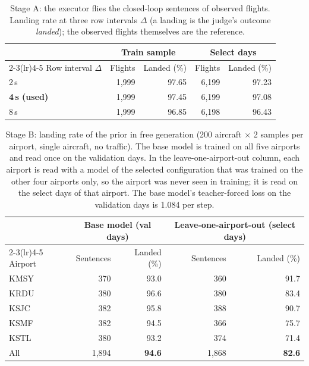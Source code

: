 
\begin{table}[t]
\centering
\caption{Stage A: the executor flies the closed-loop sentences of observed flights. Landing rate at three row intervals
$\Delta$ (a landing is the judge's outcome \emph{landed}); the observed flights themselves are the reference.}
\label{tab:result-stage-a}
\small
\renewcommand{\arraystretch}{1.2}
\begin{tabular}{@{}l rr rr@{}}
\toprule
 & \multicolumn{2}{c}{Train sample} & \multicolumn{2}{c}{Select days} \\
\cmidrule(lr){2-3}\cmidrule(lr){4-5}
Row interval $\Delta$ & Flights & Landed (\%) & Flights & Landed (\%) \\
\midrule
2\,s & 1{,}999 & 97.65 & 6{,}199 & 97.23 \\
\textbf{4\,s (used)} & 1{,}999 & 97.45 & 6{,}199 & 97.08 \\
8\,s & 1{,}999 & 96.85 & 6{,}198 & 96.43 \\
\bottomrule
\end{tabular}
\end{table}

\begin{table}[t]
\centering
\caption{Stage B: landing rate of the prior in free generation (200 aircraft $\times$ 2 samples per airport,
single aircraft, no traffic). The base model is trained on all five airports and read once on the validation days.
In the leave-one-airport-out column, each airport is read with a model of the selected configuration that was trained on the
other four airports only, so the airport was never seen in training; it is read on the select days of that airport.
The base model's teacher-forced loss on the validation days is 1.084 per step.}
\label{tab:result-stage-b}
\small
\renewcommand{\arraystretch}{1.2}
\begin{tabular}{@{}l rr rr@{}}
\toprule
 & \multicolumn{2}{c}{Base model (val days)} & \multicolumn{2}{c}{Leave-one-airport-out (select days)} \\
\cmidrule(lr){2-3}\cmidrule(lr){4-5}
Airport & Sentences & Landed (\%) & Sentences & Landed (\%) \\
\midrule
KMSY & 370 & 93.0 & 360 & 91.7 \\
KRDU & 380 & 96.6 & 380 & 83.4 \\
KSJC & 382 & 95.8 & 388 & 90.7 \\
KSMF & 382 & 94.5 & 366 & 75.7 \\
KSTL & 380 & 93.2 & 374 & 71.4 \\
\midrule
All  & 1{,}894 & \textbf{94.6} & 1{,}868 & \textbf{82.6} \\
\bottomrule
\end{tabular}
\end{table}

